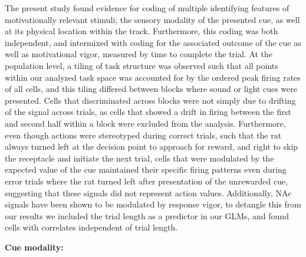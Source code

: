 \documentclass[11pt]{article}
\begin{document}
The present study found evidence for coding of multiple identifying features of motivationally relevant stimuli; the sensory modality of the presented cue, as well at its physical location within the track. Furthermore, this coding was both independent, and intermixed with coding for the associated outcome of the cue as well as motivational vigor, measured by time to complete the trial. At the population level, a tiling of task structure was observed such that all points within our analyzed task space was accounted for by the ordered peak firing rates of all cells, and this tiling differed between blocks where sound or light cues were presented.
Cells that discriminated across blocks were not simply due to drifting of the signal across trials, as cells that showed a drift in firing between the first and second half within a block were excluded from the analysis. Furthermore, even though actions were stereotyped during correct trials, such that the rat always turned left at the decision point to approach for reward, and right to skip the receptacle and initiate the next trial, cells that were modulated by the expected value of the cue maintained their specific firing patterns even during error trials where the rat turned left after presentation of the unrewarded cue, suggesting that these signals did not represent action values. Additionally, NAc signals have been shown to be modulated by response vigor, to detangle this from our results we included the trial length as a predictor in our GLMs, and found cells with correlates independent of trial length.

{\bf Cue modality:}  
\end{document}
